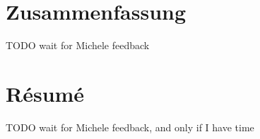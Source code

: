 %
%


%


\cleardoublepage
\chapter*{Zusammenfassung}
TODO wait for Michele feedback 
%
%
%
%
\cleardoublepage
\chapter*{Résumé}
TODO wait for Michele feedback, and only if I have time

